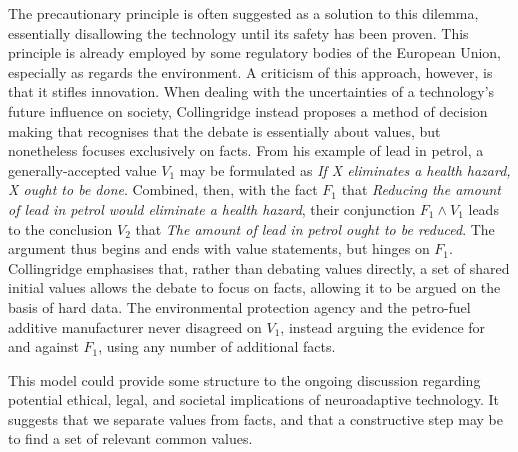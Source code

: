 The precautionary principle is often suggested as a solution to this dilemma, essentially disallowing the technology until its safety has been proven. This principle is already employed by some regulatory bodies of the European Union, especially as regards the environment. A criticism of this approach, however, is that it stifles innovation. When dealing with the uncertainties of a technology's future influence on society, Collingridge instead proposes a method of decision making that recognises that the debate is essentially about values, but nonetheless focuses exclusively on facts. From his example of lead in petrol, a generally-accepted value $V_1$ may be formulated as \emph{If X eliminates a health hazard, X ought to be done}. Combined, then, with the fact $F_1$ that \emph{Reducing the amount of lead in petrol would eliminate a health hazard}, their conjunction $F_1 \land V_1$ leads to the conclusion $V_2$ that \emph{The amount of lead in petrol ought to be reduced}. The argument thus begins and ends with value statements, but hinges on $F_1$. Collingridge emphasises that, rather than debating values directly, a set of shared initial values allows the debate to focus on facts, allowing it to be argued on the basis of hard data. The environmental protection agency and the petro-fuel additive manufacturer never disagreed on $V_1$, instead arguing the evidence for and against $F_1$, using any number of additional facts.

This model could provide some structure to the ongoing discussion regarding potential ethical, legal, and societal implications of neuroadaptive technology. It suggests that we separate values from facts, and that a constructive step may be to find a set of relevant common values. 

